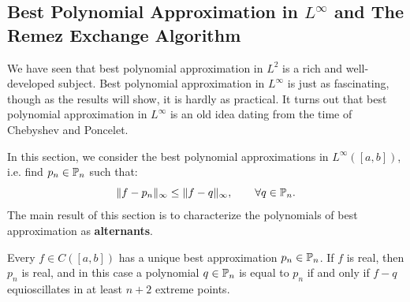 \subsection{Best Polynomial Approximation in $L^\infty$ and The Remez Exchange Algorithm}

We have seen that best polynomial approximation in $L^2$ is a rich and well-developed subject. Best polynomial approximation in $L^\infty$ is just as fascinating, though as the results will show, it is hardly as practical. It turns out that best polynomial approximation in $L^\infty$ is an old idea dating from the time of Chebyshev and Poncelet.

In this section, we consider the best polynomial approximations in $L^\infty([a,b])$, i.e. find $p_n\in\P_n$ such that:
\[
\|f-p_n\|_\infty \le \|f-q\|_\infty,\qquad\forall q\in\P_n.
\]
The main result of this section is to characterize the polynomials of best approximation as {\bf alternants}.
\begin{theorem}\label{theorem:Equioscillation}
Every $f\in C([a,b])$ has a unique best approximation $p_n\in\P_n$. If $f$ is real, then $p_n$ is real, and in this case a polynomial $q\in\P_n$ is equal to $p_n$ if and only if $f-q$ equioscillates in at least $n+2$ extreme points.
\end{theorem}
